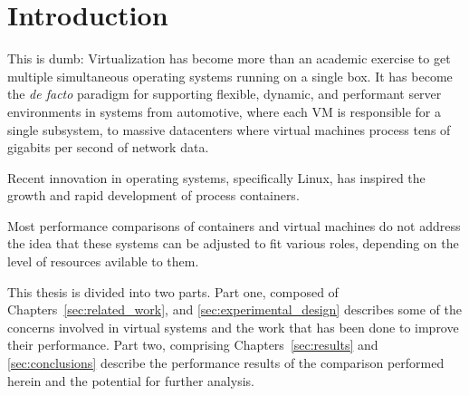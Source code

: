 \chapter{Introduction}
\label{cha:introduction}
\label{sec:introduction}
This is dumb: Virtualization has become more than an academic exercise to get multiple simultaneous operating systems running on a single box.  
It has become the \emph{de facto} paradigm for supporting flexible, dynamic, and performant server environments in systems from automotive, where each VM is responsible for a single subsystem, to massive datacenters where virtual machines process tens of gigabits per second of network data.

Recent innovation in operating systems, specifically Linux, has inspired the growth and rapid development of process containers.

Most performance comparisons of containers and virtual machines do not address the idea that these systems can be adjusted to fit various roles, depending on the level of resources avilable to them.  


This thesis is divided into two parts.
Part one, composed of Chapters~\ref{sec:related_work}, and \ref{sec:experimental_design} describes some of the concerns involved in virtual systems and the work that has been done to improve their performance.
Part two, comprising Chapters~\ref{sec:results} and \ref{sec:conclusions} describe the performance results of the comparison performed herein and the potential for further analysis.
